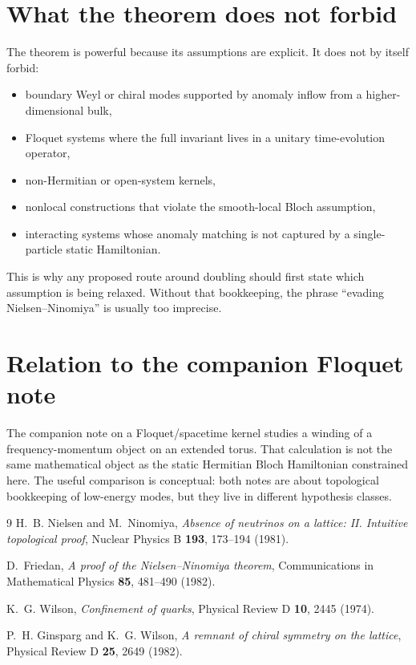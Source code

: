 \documentclass[11pt]{article}
\begin{document}
\section{What the theorem does not forbid}
The theorem is powerful because its assumptions are explicit. It does not by itself forbid:
\begin{itemize}
  \item boundary Weyl or chiral modes supported by anomaly inflow from a higher-dimensional bulk,
  \item Floquet systems where the full invariant lives in a unitary time-evolution operator,
  \item non-Hermitian or open-system kernels,
  \item nonlocal constructions that violate the smooth-local Bloch assumption,
  \item interacting systems whose anomaly matching is not captured by a single-particle static Hamiltonian.
\end{itemize}
This is why any proposed route around doubling should first state which assumption is being relaxed. Without that bookkeeping, the phrase ``evading Nielsen--Ninomiya'' is usually too imprecise.

\section{Relation to the companion Floquet note}
The companion note on a Floquet/spacetime kernel studies a winding of a frequency-momentum object on an extended torus. That calculation is not the same mathematical object as the static Hermitian Bloch Hamiltonian constrained here. The useful comparison is conceptual: both notes are about topological bookkeeping of low-energy modes, but they live in different hypothesis classes.

\begin{thebibliography}{9}
H.~B. Nielsen and M.~Ninomiya,
\emph{Absence of neutrinos on a lattice: II. Intuitive topological proof},
Nuclear Physics B \textbf{193}, 173--194 (1981).

D.~Friedan,
\emph{A proof of the Nielsen--Ninomiya theorem},
Communications in Mathematical Physics \textbf{85}, 481--490 (1982).

K.~G. Wilson,
\emph{Confinement of quarks},
Physical Review D \textbf{10}, 2445 (1974).

P.~H. Ginsparg and K.~G. Wilson,
\emph{A remnant of chiral symmetry on the lattice},
Physical Review D \textbf{25}, 2649 (1982).
\end{thebibliography}
\end{document}

